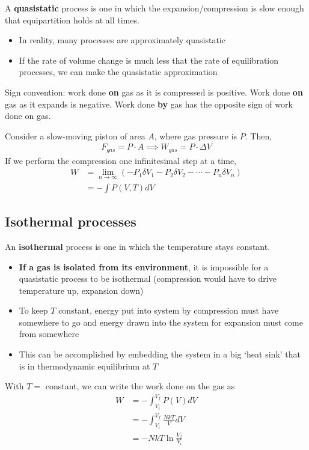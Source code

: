 \documentclass[11pt]{article}
\begin{document}
A \textbf{quasistatic} process is one in which the expansion/compression is slow enough that equipartition holds at all times. 
\begin{itemize}
    \item In reality, many processes are approximately quasistatic
    \item If the rate of volume change is much less that the rate of equilibration processes, we can make the quasistatic approximation
\end{itemize}
Sign convention: work done \textbf{on} gas as it is compressed is positive. Work done \textbf{on} gas as it expands is negative. Work done \textbf{by} gas has the opposite sign of work done on gas. 

Consider a slow-moving piston of area $A$, where gas pressure is $P$. Then, 
\begin{align*}
    F_{gas} = P \cdot A \implies W_{gas} = P \cdot \Delta V
\end{align*}
If we perform the compression one infinitesimal step at a time, 
\begin{align*}
    W &= \lim_{n \to \infty} (- P_1 \delta V_1 - P_2 \delta V_2 - \cdots - P_n \delta V_n) \\
    &= - \int P(V,T) dV 
\end{align*}

\subsection{Isothermal processes}

An \textbf{isothermal} process is one in which the temperature stays constant. 
\begin{itemize}
    \item \textbf{If a gas is isolated from its environment}, it is impossible for a quasistatic process to be isothermal (compression would have to drive temperature up, expansion down) 
    \item To keep $T$ constant, energy put into system by compression must have somewhere to go and energy drawn into the system for expansion must come from somewhere
    \item This can be accomplished by embedding the system in a big `heat sink' that is in thermodynamic equilibrium at $T$
\end{itemize}
With $T = $ constant, we can write the work done on the gas as 
\begin{align*}
    W &= - \int_{V_i}^{V_f} P(V) dV \\
    &= -\int_{V_i}^{V_f} \frac{NkT}{V} dV \\
    &= - NkT \ln{\frac{V_f}{V_i}}
\end{align*}
\end{document}
